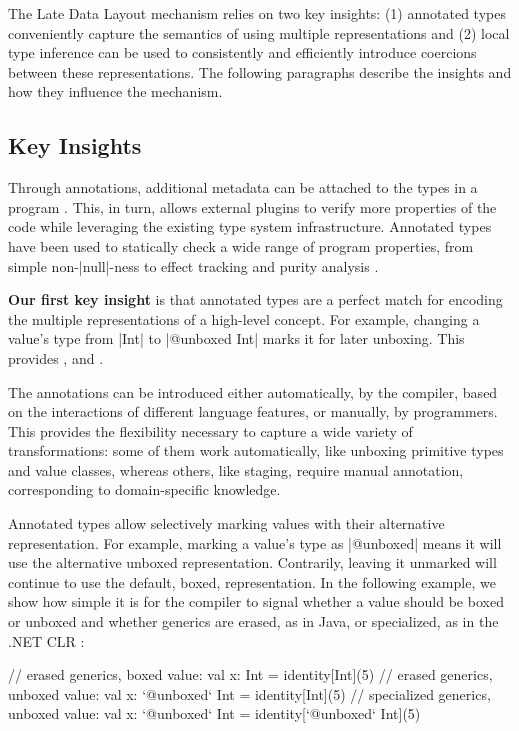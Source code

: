 \noindent The Late Data Layout mechanism relies on two key insights: (1) annotated types conveniently capture the semantics of using multiple representations and (2) local type inference can be used to consistently and efficiently introduce coercions between these representations. The following paragraphs describe the insights and how they influence the mechanism.

\subsection*{Key Insights}

Through annotations, additional metadata can be attached to the types in a program \cite{sip-annotations, jsr-annotations}. This, in turn, allows external plugins to verify more properties of the code while leveraging the existing type system infrastructure. Annotated types have been used to statically check a wide range of program properties, from simple non-|null|-ness to effect tracking and purity analysis \cite{papi-annot-typechecker, lukas-thesis}.

\textbf{Our first key insight} is that annotated types are a perfect match for encoding the multiple representations of a high-level concept. For example, changing a value's type from |Int| to |@unboxed Int| marks it for later unboxing. This provides ,  and .

 The annotations can be introduced either automatically, by the compiler, based on the interactions of different language features, or manually, by programmers. This provides the flexibility necessary to capture a wide variety of transformations: some of them work automatically, like unboxing primitive types and value classes, whereas others, like staging, require manual annotation, corresponding to domain-specific knowledge.

 Annotated types allow selectively marking values with their alternative representation. For example, marking a value's type as |@unboxed| means it will use the alternative unboxed representation. Contrarily, leaving it unmarked will continue to use the default, boxed, representation. In the following example, we show how simple it is for the compiler to signal whether a value should be boxed or unboxed and whether generics are erased, as in Java, or specialized, as in the .NET CLR \cite{dot-net-generics, ecma-dotnet}:

\begin{lstlisting-nobreak}
 // erased generics, boxed value:
 val x: Int = identity[Int](5)
 // erased generics, unboxed value:
 val x: `@unboxed` Int = identity[Int](5)
 // specialized generics, unboxed value:
 val x: `@unboxed` Int = identity[`@unboxed` Int](5)
\end{lstlisting-nobreak}

